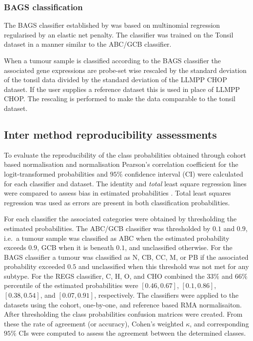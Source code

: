 \documentclass{article}
\begin{document}
\subsubsection{BAGS classification}
The BAGS classifier established by \citet{DybkaerBoegsted2015} was based on multinomial regression regularised by an elastic net penalty.
The classifier was trained on the Tonsil dataset in a manner similar to the ABC/GCB classifier.

When a tumour sample is classified according to the BAGS classifier the associated gene expressions are probe-set wise rescaled by the standard deviation of the tonsil data divided by the standard deviation of the LLMPP CHOP dataset.
If the user supplies a reference dataset this is used in place of LLMPP CHOP.
The rescaling is performed to make the data comparable to the tonsil dataset.


\subsection{Inter method reproducibility assessments}
To evaluate the reproducibility of the class probabilities obtained through cohort based normalisation and \hemaClass{} normalisation Pearson's correlation coefficient for the logit-transformed probabilities and $95\%$ confidence interval (CI) were calculated for each classifier and dataset.
The identity and \emph{total} least square regression lines were compared to assess bias in estimated probabilities \citep{CHEN1989}.
Total least squares regression was used as errors are present in both classification probabilities.

For each classifier the associated categories were obtained by thresholding the estimated probabilities.
The ABC/GCB classifier was thresholded by $0.1$ and $0.9$, i.e.\ a tumour sample was classified as ABC when the estimated probability exceeds $0.9$, GCB when it is beneath $0.1$, and unclassified otherwise.
For the BAGS classifier a tumour was classified as N, CB, CC, M, or PB if the associated probability exceeded $0.5$ and unclassified when this threshold was not met for any subtype.
For the REGS classifier, C, H, O, and CHO combined the $33\%$ and $66\%$ percentile of the estimated probabilities were $[0.46, 0.67]$, $[0.1, 0.86]$, $[0.38, 0.54]$, and $[0.07, 0.91]$, respectively.
The classifiers were applied to the datasets using the cohort, one-by-one, and reference based RMA normalisaiton.
After thresholding the class probabilities confusion matrices were created.
From these the rate of agreement (or accuracy), Cohen's weighted $\kappa$, and corresponding $95\%$ CIs were computed to assess the agreement between the determined classes.
\end{document}
